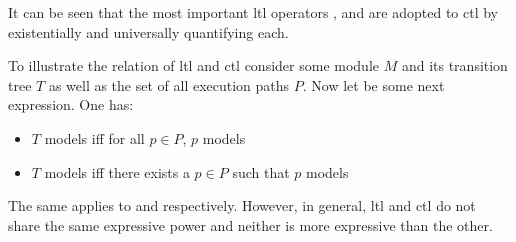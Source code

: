 It can be seen that the most important \gls{ltl} operators ,  and  are adopted to \gls{ctl} by existentially and universally quantifying each.

\begin{example}
    To illustrate the relation of \gls{ltl} and \gls{ctl} consider some module $ M $ and its transition tree $ T $ as well as the set of all execution paths $ P $.
    Now let  be some next expression.
    One has:
    \begin{itemize}
        \item $ T $ models  iff for all $ p \in P $, $ p $ models 
        \item $ T $ models  iff there exists a $ p \in P $ such that $ p $ models 
    \end{itemize}
    The same applies to  and  respectively.
    However, in general, \gls{ltl} and \gls{ctl} do not share the same expressive power and neither is more expressive than the other.
\end{example}

